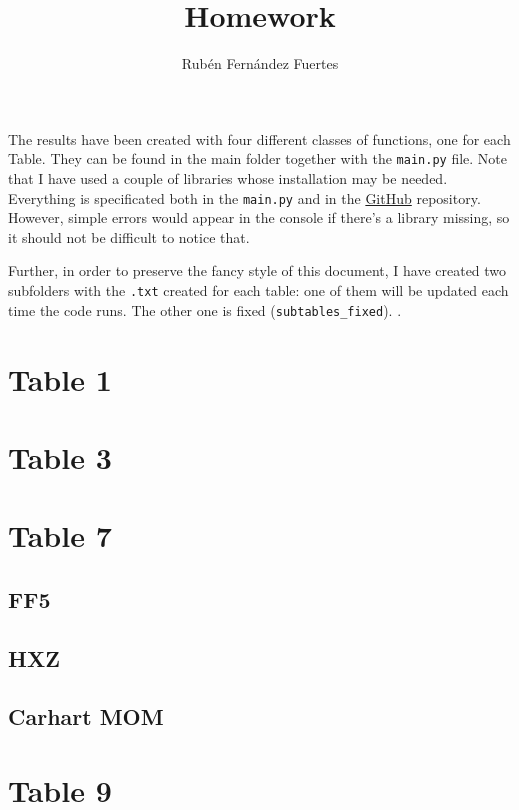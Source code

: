 \documentclass[10pt]{article}
\author{Rubén Fernández Fuertes}
\title{Homework}
\begin{document}
	
	\maketitle
	
	The results have been created with four different classes of functions, one for each Table. They can be found in the main folder together with the \texttt{main.py} file. Note that I have used a couple of libraries whose installation may be needed. Everything is specificated both in the \texttt{main.py} and in the \href{https://github.com/r-uben/hw}{GitHub} repository. However, simple errors would appear in the console if there's a library missing, so it should not be difficult to notice that.
	
	Further, in order to preserve the fancy style of this document, I have created two subfolders with the \texttt{.txt} created for each table: one of them will be updated each time the code runs. The other one is fixed (\texttt{subtables\_fixed}).
.	
	\section{Table 1}
		
		
		
	\newpage
	\section{Table 3}
		
		
		
	\newpage
	\section{Table 7}
	\subsection{FF5}
		
	\subsection{HXZ}
		
	\subsection{Carhart MOM}
		
		
		
	
	\phantom{a}
	\newpage
	\section{Table 9}
	
	
	
\end{document}
